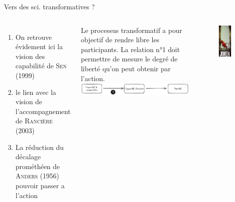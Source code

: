 \documentclass[newPxFont]{beamer}
\begin{document}
\begin{frame}[c]{Vers des sci. transformatives ?}
  \vspace{-1cm}
  \begin{columns}[onlytextwidth,T]
    \column{\dimexpr\linewidth-30mm-5mm}
    \begin{enumerate}
        \item On retrouve évidement ici la vision des capabilité de \textsc{Sen} (1999)
        \item le lien avec la vision de l’accompagnement de \textsc{Rancière} (2003)
        \item La réduction du décalage prométhéen de \textsc{Anders} (1956) pouvoir passer a l'action
    \end{enumerate}
    Le processus transformatif a pour objectif de rendre libre les participants. La relation n°1 doit permettre de mesure le degré de liberté qu’on peut obtenir par l’action.
    \includegraphics[width=7.5cm]{img/Drawing_jpm}
    \column{30mm}
    \begin{figure}
      \includegraphics[width=3.9cm]{img/joker.jpg}
    \end{figure}
  \end{columns}
\end{frame}
\end{document}
